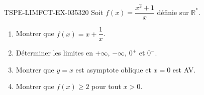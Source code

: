 \begin{exercice}{TSPE-LIMFCT-EX-035}{3}{20}
Soit $f(x) = \dfrac{x^2 + 1}{x}$ définie sur $\mathbb{R}^*$.
\begin{enumerate}
  \item Montrer que $f(x) = x + \dfrac{1}{x}$.
  \item Déterminer les limites en $+\infty$, $-\infty$, $0^+$ et $0^-$.
  \item Montrer que $y = x$ est asymptote oblique et $x = 0$ est AV.
  \item Montrer que $f(x) \geq 2$ pour tout $x > 0$.
\end{enumerate}
\end{exercice}
